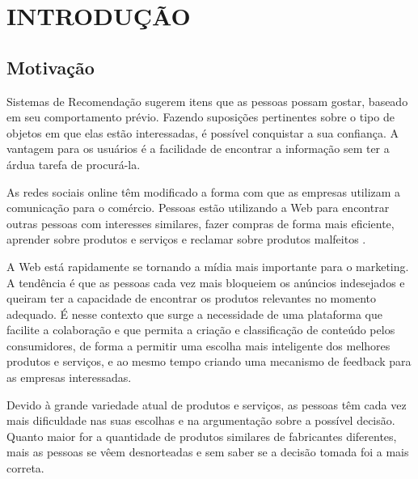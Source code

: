 \chapter{INTRODUÇÃO}  %
\label{cha:introducao}

\section{Motivação} %
\label{sec:motivacao}




 Sistemas de Recomendação sugerem itens que as pessoas possam gostar, baseado em seu comportamento prévio. Fazendo suposições pertinentes sobre o tipo de objetos em que elas estão interessadas, é possível conquistar a sua confiança. A vantagem para os usuários é a facilidade de encontrar a informação sem ter a árdua tarefa de procurá-la.

 As redes sociais online têm modificado a forma com que as empresas utilizam a comunicação para o comércio. Pessoas estão utilizando a Web para encontrar outras pessoas com interesses similares, fazer compras de forma mais eficiente, aprender sobre produtos e serviços e reclamar sobre produtos malfeitos \cite{marketing_social_web}.

 A Web está rapidamente se tornando a mídia mais importante para o marketing. A tendência é que as pessoas cada vez mais bloqueiem os anúncios indesejados e queiram ter a capacidade de encontrar os produtos relevantes no momento adequado. É nesse contexto que surge a necessidade de uma plataforma que facilite a colaboração e que permita a criação e classificação de conteúdo pelos consumidores, de forma a permitir uma escolha mais inteligente dos melhores produtos e serviços, e ao mesmo tempo criando uma mecanismo de feedback para as empresas interessadas.

 Devido à grande variedade atual de produtos e serviços, as pessoas têm cada vez mais dificuldade nas suas escolhas e na argumentação sobre a possível decisão. Quanto maior for a quantidade de produtos similares de fabricantes diferentes, mais as pessoas se vêem desnorteadas e sem saber se a decisão tomada foi a mais correta.

